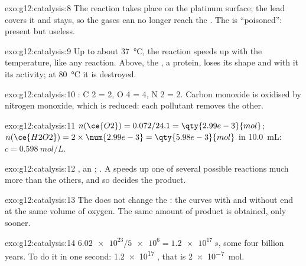 \begin{solution}{exo:g12:catalysis:8}
The reaction takes place on the platinum surface; the lead covers it and
stays, so the gases can no longer reach the . The  is
``poisoned'': present but useless.
\end{solution}

\begin{solution}{exo:g12:catalysis:9}
Up to about \qty{37}{\celsius}, the reaction speeds up with the
temperature, like any reaction. Above, the , a protein, loses its
shape and with it its activity; at \qty{80}{\celsius} it is destroyed.
\end{solution}

\begin{solution}{exo:g12:catalysis:10}
: C 2 = 2, O 4 = 4, N 2 = 2. Carbon monoxide is
oxidised by nitrogen monoxide, which is reduced: each pollutant removes
the other.
\end{solution}

\begin{solution}{exo:g12:catalysis:11}
$n(\ce{O2}) = 0.072 / 24.1 = \qty{2.99e-3}{mol}$;
$n(\ce{H2O2}) = 2 \times \num{2.99e-3} = \qty{5.98e-3}{mol}$ in
\qty{10.0}{mL}: $c = \qty{0.598}{mol/L}$.
\end{solution}

\begin{solution}{exo:g12:catalysis:12}
, an ; .
A  speeds up one of several possible reactions much
more than the others, and so decides the product.
\end{solution}

\begin{solution}{exo:g12:catalysis:13}
The  does not change the : the curves with and
without  end at the same volume of oxygen. The same amount of
product is obtained, only sooner.
\end{solution}

\begin{solution}{exo:g12:catalysis:14}
$\num{6.02e23} / \num{5e6} = \qty{1.2e17}{s}$, some four billion years.
To do it in one second: \num{1.2e17}  , that is
\qty{2e-7}{mol}.
\end{solution}

